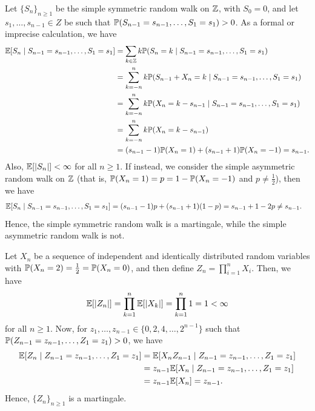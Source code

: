 \begin{example}
    Let $\{S_{n}\}_{n \geq 1}$ be the simple symmetric random walk on $\mathbb{Z}$, with $S_{0} = 0$, and let $s_{1},\ldots,s_{n-1} \in Z$ be such that $\mathbb{P}(S_{n-1}=s_{n-1},\ldots,S_{1}=s_{1}) > 0$. As a formal or imprecise calculation, we have
    \begin{align}
        \mathbb{E}[S_{n} \mid S_{n-1}=s_{n-1},\ldots,S_{1}=s_{1}] &= \sum_{k \in \mathbb{Z}} k \mathbb{P}(S_{n}=k \mid S_{n-1}=s_{n-1},\ldots,S_{1}=s_{1}) \notag \\
        &= \sum_{k =-n}^{n} k \mathbb{P}(S_{n-1}+X_{n}=k \mid S_{n-1}=s_{n-1},\ldots,S_{1}=s_{1}) \notag \\
        &= \sum_{k =-n}^{n} k \mathbb{P}(X_{n}=k-s_{n-1} \mid S_{n-1}=s_{n-1},\ldots,S_{1}=s_{1}) \notag \\
        &= \sum_{k =-n}^{n} k \mathbb{P}(X_{n}=k-s_{n-1}) \notag \\
        &= (s_{n-1}-1)\mathbb{P}(X_{n}=1) + (s_{n-1}+1)\mathbb{P}(X_{n}=-1) = s_{n-1}.
    \end{align}
    Also, $\mathbb{E}[\left| S_{n} \right|] < \infty$ for all $n \geq 1$. If instead, we consider the simple asymmetric random walk on $\mathbb{Z}$ (that is, $\mathbb{P}(X_{n}=1) = p = 1-\mathbb{P}(X_{n}=-1)$ and $p \neq \frac{1}{2}$), then we have
    \begin{align}
        \mathbb{E}[S_{n} \mid S_{n-1}=s_{n-1},\ldots,S_{1}=s_{1}] &= (s_{n-1}-1)p + (s_{n-1}+1)(1-p) = s_{n-1} + 1 - 2p \neq s_{n-1}.
    \end{align}
    Hence, the simple symmetric random walk is a martingale, while the simple asymmetric random walk is not.
\end{example}

\begin{example}
    Let $X_{n}$ be a sequence of independent and identically distributed random variables with $\mathbb{P}(X_{n} = 2) = \frac{1}{2} = \mathbb{P}(X_{n} = 0)$, and then define $Z_{n} = \prod_{i=1}^{n} X_{i}$. Then, we have
    \begin{align}
        \mathbb{E}[\left| Z_{n} \right|] = \prod_{k=1}^{n} \mathbb{E}[\left| X_{k} \right|] = \prod_{k=1}^{n} 1 = 1 < \infty
    \end{align}
    for all $n \geq 1$. Now, for $z_{1},\ldots,z_{n-1} \in \{0,2,4,\ldots,2^{n-1}\}$ such that $\mathbb{P}(Z_{n-1}=z_{n-1},\ldots,Z_{1}=z_{1}) > 0$, we have
    \begin{align}
        \mathbb{E}[Z_{n} \mid Z_{n-1}=z_{n-1},\ldots,Z_{1}=z_{1}] &= \mathbb{E}[X_{n} Z_{n-1} \mid Z_{n-1}=z_{n-1},\ldots,Z_{1}=z_{1}] \notag \\
        &= z_{n-1} \mathbb{E}[X_{n} \mid Z_{n-1}=z_{n-1},\ldots,Z_{1}=z_{1}] \notag \\
        &= z_{n-1} \mathbb{E}[X_{n}] = z_{n-1}.
    \end{align}
    Hence, $\{Z_{n}\}_{n \geq 1}$ is a martingale.
\end{example}

